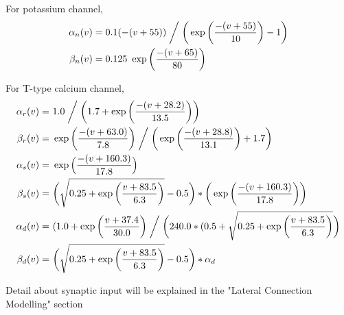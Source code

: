 For potassium channel, %
\begin{align*}
\alpha_{n}(v)&=0.1(-(v+55))  \biggm/  \bigg( \exp \bigg( \frac{-(v+55)}{10} \bigg) - 1 \bigg)\\
\beta_{n}(v)&=0.125\ \exp \bigg(\frac{-(v+65)}{80}\bigg)\\
\end{align*}

For T-type calcium channel, %
\begin{align*} %
\alpha_{r}(v) =&\ 1.0\biggm/ \bigg(1.7+\exp\bigg(\frac{-(v+28.2)}{13.5}\bigg)\bigg)  \\
\beta_{r}(v) =&\ \exp\bigg(\frac{-(v+63.0)}{7.8}\bigg) \biggm/  \bigg( \exp \bigg( \frac{-(v+28.8)}{13.1} \bigg) +1.7\bigg)\\
\alpha_{s}(v) =&\ \exp \Big(\frac{-(v+160.3)}{17.8}\Big)\\
\beta_{s}(v) =&\ \bigg(\sqrt{0.25+\exp\bigg(\frac{v+83.5}{6.3}\bigg)}-0.5\bigg) *  \bigg(\exp\bigg(\frac{-(v+160.3)}{17.8}\bigg)\bigg)\\
\alpha_{d}(v) =&\ (1.0+\exp\bigg(\frac{v+37.4}{30.0}\bigg) \biggm/ \bigg(240.0*(0.5+ \sqrt{0.25+\exp\bigg(\frac{v+83.5}{6.3} \bigg) } \bigg) \\
\beta_{d}(v) =&\ \bigg(\sqrt{0.25+\exp\bigg(\frac{v+83.5}{6.3} \bigg) } -0.5\bigg)*\alpha_d\\  
\end{align*}

%
%
%
%
Detail about synaptic input will be explained in the "Lateral Connection Modelling" section



%
%
%
%
%
%

